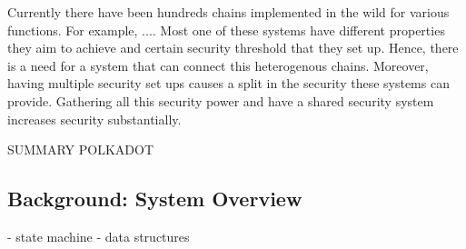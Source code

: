 Currently there have been hundreds chains implemented in the wild for various functions.
For example, ....
Most one of these systems have different properties they aim to achieve and certain security threshold that they set up. Hence, there is a need for a system that can connect this heterogenous chains.
Moreover, having multiple security set ups causes a split in the security these systems can provide.
Gathering all this security power and have a shared security system increases security substantially.

SUMMARY POLKADOT

\subsection{Background: System Overview}
- state machine
- data structures

